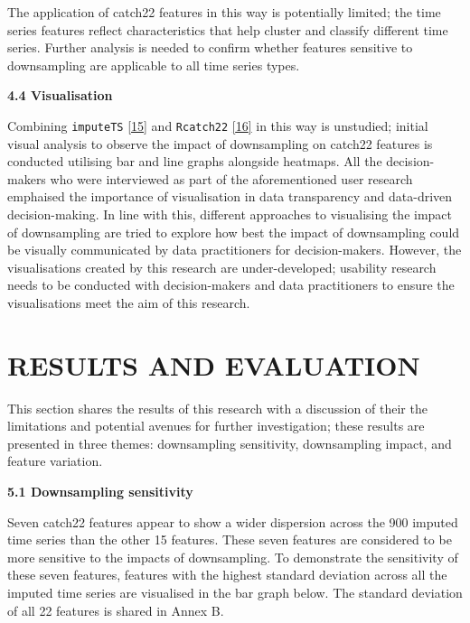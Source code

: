 \documentclass{article}
\begin{document}
The application of catch22 features in this way is potentially limited;
the time series features reflect characteristics that help cluster and
classify different time series. Further analysis is needed to confirm
whether features sensitive to downsampling are applicable to all time
series types.

\textbf{4.4 Visualisation}

Combining \texttt{imputeTS} \protect\hyperlink{ref-imputeTS_R}{{[}15{]}}
and \texttt{Rcatch22} \protect\hyperlink{ref-catch22_R}{{[}16{]}} in
this way is unstudied; initial visual analysis to observe the impact of
downsampling on catch22 features is conducted utilising bar and line
graphs alongside heatmaps. All the decision-makers who were interviewed
as part of the aforementioned user research emphaised the importance of
visualisation in data transparency and data-driven decision-making. In
line with this, different approaches to visualising the impact of
downsampling are tried to explore how best the impact of downsampling
could be visually communicated by data practitioners for
decision-makers. However, the visualisations created by this research
are under-developed; usability research needs to be conducted with
decision-makers and data practitioners to ensure the visualisations meet
the aim of this research.

\hypertarget{results-and-evaluation}{%
\section{RESULTS AND EVALUATION}\label{results-and-evaluation}}

\vspace{-0.4cm}

This section shares the results of this research with a discussion of
their the limitations and potential avenues for further investigation;
these results are presented in three themes: downsampling sensitivity,
downsampling impact, and feature variation.

\textbf{5.1 Downsampling sensitivity}

Seven catch22 features appear to show a wider dispersion across the 900
imputed time series than the other 15 features. These seven features are
considered to be more sensitive to the impacts of downsampling. To
demonstrate the sensitivity of these seven features, features with the
highest standard deviation across all the imputed time series are
visualised in the bar graph below. The standard deviation of all 22
features is shared in Annex B.
\end{document}
